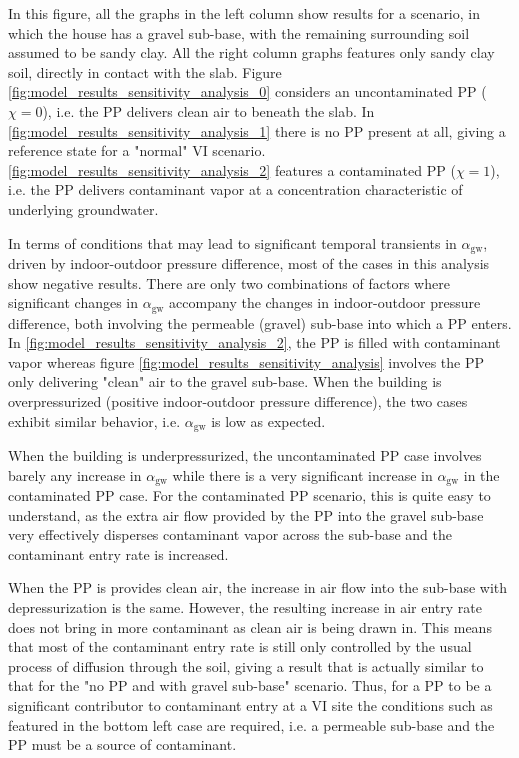 \documentclass[journal=esthag,manuscript=article]{achemso}
\begin{document}
In this figure, all the graphs in the left column show results for a scenario, in which the house has a gravel sub-base, with the remaining surrounding soil assumed to be sandy clay.
All the right column graphs features only sandy clay soil, directly in contact with the slab.
Figure \ref{fig:model_results_sensitivity_analysis_0} considers an uncontaminated PP ($\chi = 0$), i.e. the PP delivers clean air to beneath the slab.
In \ref{fig:model_results_sensitivity_analysis_1} there is no PP present at all, giving a reference state for a "normal" VI scenario.
\ref{fig:model_results_sensitivity_analysis_2} features a contaminated PP ($\chi = 1$), i.e. the PP delivers contaminant vapor at a concentration characteristic of underlying groundwater.

In terms of conditions that may lead to significant temporal transients in $\alpha_\mathrm{gw}$, driven by indoor-outdoor pressure difference, most of the cases in this analysis show negative results.
There are only two combinations of factors where significant changes in $\alpha_\mathrm{gw}$ accompany the changes in indoor-outdoor pressure difference, both involving the permeable (gravel) sub-base into which a PP enters.
In \ref{fig:model_results_sensitivity_analysis_2}, the PP is filled with contaminant vapor whereas figure \ref{fig:model_results_sensitivity_analysis} involves the PP only delivering "clean" air to the gravel sub-base.
When the building is overpressurized (positive indoor-outdoor pressure difference), the two cases exhibit similar behavior, i.e. $\alpha_\mathrm{gw}$ is low as expected.

When the building is underpressurized, the uncontaminated PP case involves barely any increase in $\alpha_\mathrm{gw}$ while there is a very significant increase in $\alpha_\mathrm{gw}$ in the contaminated PP case.
For the contaminated PP scenario, this is quite easy to understand, as the extra air flow provided by the PP into the gravel sub-base very effectively disperses contaminant vapor across the sub-base and the contaminant entry rate is increased.

When the PP is provides clean air, the increase in air flow into the sub-base with depressurization is the same.
However, the resulting increase in air entry rate does not bring in more contaminant as clean air is being drawn in.
This means that most of the contaminant entry rate is still only controlled by the usual process of diffusion through the soil, giving a result that is actually similar to that for the "no PP and with gravel sub-base" scenario.
Thus, for a PP to be a significant contributor to contaminant entry at a VI site the conditions such as featured in the bottom left case are required, i.e. a permeable sub-base and the PP must be a source of contaminant.
\end{document}
